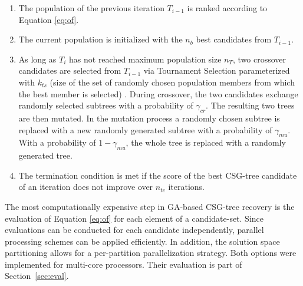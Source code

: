 \begin{enumerate}
\item The population of the previous iteration $T_{i-1}$ is ranked according to Equation \ref{eq:of}.
\item The current population is initialized with the $n_b$ best candidates from $T_{i-1}$.
\item As long as $T_i$ has not reached maximum population size $n_T$, two crossover candidates are selected from $T_{i-1}$ via Tournament Selection parameterized with $k_{ts}$ (size of the set of randomly chosen population members from which the best member is selected) \cite{miller95genetic}.
During crossover, the two candidates exchange randomly selected subtrees with a probability of $\gamma_{cr}$.
The resulting two trees are then mutated. 
In the mutation process a randomly chosen subtree is replaced with a new randomly generated subtree with a probability of $\gamma_{mu}$.
With a probability of $1-\gamma_{mu}$, the whole tree is replaced with a randomly generated tree.
\item The termination condition is met if the score of the best \ac{CSG}-tree candidate of an iteration does not improve over $n_{tc}$ iterations.  	 
\end{enumerate}  
The most computationally expensive step in \ac{GA}-based \ac{CSG}-tree recovery is the evaluation of Equation \ref{eq:of} for each element of a candidate-set. 
Since evaluations can be conducted for each candidate independently, parallel processing schemes can be applied efficiently.  
In addition, the solution space partitioning allows for a per-partition parallelization strategy.
Both options were implemented for multi-core processors. Their evaluation is part of Section~\ref{sec:eval}.
